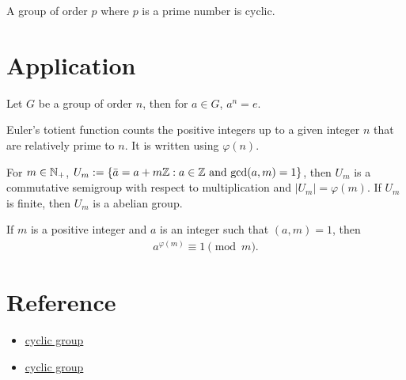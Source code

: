 \begin{corollary}{}{}
    A group of order $p$ where $p$ is a prime number is cyclic.
\end{corollary}

\section{Application}
\begin{proposition}{}{}
    Let $G$ be a group of order $n$, then for $a\in G$, $a^n=e$.
\end{proposition}

\begin{definition}{}{}
    Euler's totient function counts the positive integers up to a given integer $n$ that are relatively prime to $n$. 
    It is written using $\varphi(n)$. 
\end{definition}

\begin{proposition}{}{}
    For $m\in \mathbb{N}_+$, $U_m:=\{\bar{a}=a+m\mathbb{Z}: a\in \mathbb{Z} \text{ and } \text{gcd}(a,m)=1\}$,
    then $U_m$ is a commutative semigroup with respect to multiplication 
    and $|U_m|=\varphi(m)$. If $U_m$ is finite, then $U_m$ is a abelian group.
\end{proposition}

\begin{theorem}{}{}
    If $m$ is a positive integer and $a$ is an integer such that $(a,m)=1$, then
    \begin{align*}
        a^{\varphi(m)}\equiv 1\pmod m.
    \end{align*}
\end{theorem}

\section{Reference}
\begin{itemize}
    \item \href{https://sites.millersville.edu/bikenaga/abstract-algebra-1/cyclic-groups/cyclic-groups.pdf}{cyclic group}
    \item \href{https://faculty.etsu.edu/gardnerr/5410/notes/I-3.pdf}{cyclic group}
\end{itemize}